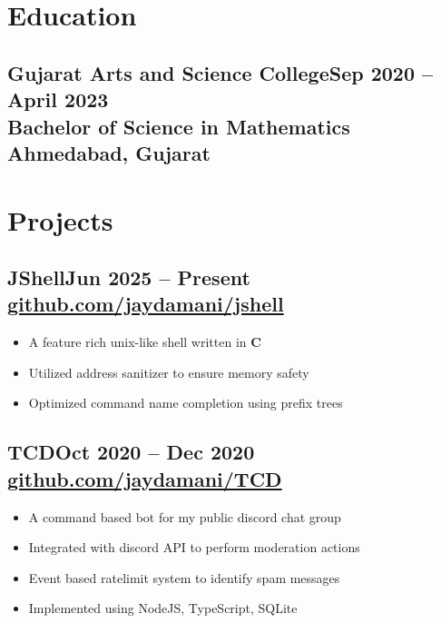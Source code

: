 \documentclass[a4paper]{article}
\newcommand{\experiencetitle}[4]{\subsection{\texorpdfstring{{#1}\hfill\small \textmd{#4} \\
\textmd{#3} \hfill \textmd{#2}}{#1}}}
\begin{document}
\section{Education}
\experiencetitle
{Gujarat Arts and Science College}{Ahmedabad, Gujarat}
{Bachelor of Science in Mathematics}{Sep 2020 -- April 2023}

\section{Projects}
\experiencetitle
{JShell}{}
{\href{https://github.com/jaydamani/jshell}{github.com/jaydamani/jshell}}{Jun 2025 -- Present}
\begin{itemize}
	\item A feature rich unix-like shell written in \textbf{C}
	\item Utilized address sanitizer to ensure memory safety
	\item Optimized command name completion using prefix trees
\end{itemize}

\experiencetitle
{TCD}{}
{\href{https://github.com/jaydamani/TCD}{github.com/jaydamani/TCD}}{Oct 2020 -- Dec 2020}
\begin{itemize}
	\item A command based bot for my public discord chat group
	\item Integrated with discord API to perform moderation actions
	\item Event based ratelimit system to identify spam messages
	\item Implemented using NodeJS, TypeScript, SQLite
\end{itemize}


\end{document}
